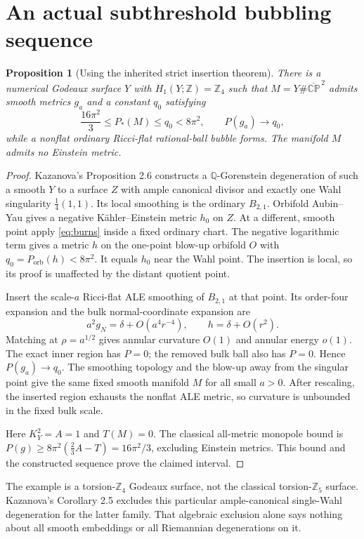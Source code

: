 \documentclass[11pt]{article}
\newtheorem{proposition}[theorem]{Proposition}
\newcommand{\CP}{\mathbb{CP}}
\newcommand{\orb}{\mathrm{orb}}
\begin{document}
\section{An actual subthreshold bubbling sequence}\label{sec:subthreshold}
\begin{proposition}[Using the inherited strict insertion theorem]
There is a numerical Godeaux surface $Y$ with $H_1(Y;\mathbb Z)=\mathbb Z_4$
such that $M=Y\#\overline{\CP}^{\,2}$ admits smooth metrics $g_a$ and a
constant $q_0$ satisfying
\[
 \frac{16\pi^2}{3}\le P_*(M)\le q_0<8\pi^2,
 \qquad P(g_a)\longrightarrow q_0,
\]
while a nonflat ordinary Ricci-flat rational-ball bubble forms.
The manifold $M$ admits no Einstein metric.
\end{proposition}
\begin{proof}
Kazanova's Proposition 2.6 constructs a $\mathbb Q$-Gorenstein degeneration
of such a smooth $Y$ to a surface $Z$ with ample canonical divisor and
exactly one Wahl singularity $\frac14(1,1)$. Its local smoothing is the
ordinary $B_{2,1}$. Orbifold Aubin--Yau gives a negative K\"ahler--Einstein
metric $h_0$ on $Z$. At a different, smooth point apply \eqref{eq:burns}
inside a fixed ordinary chart. The negative logarithmic term gives a
metric $h$ on the one-point blow-up orbifold $O$ with
$q_0=P_{\orb}(h)<8\pi^2$. It equals $h_0$ near the Wahl point.
The insertion is local, so its proof is unaffected by the distant quotient
point.

Insert the scale-$a$ Ricci-flat ALE smoothing of $B_{2,1}$ at that point.
Its order-four expansion and the bulk normal-coordinate expansion are
\[
 a^2g_N=\delta+O(a^4r^{-4}),\qquad h=\delta+O(r^2).
\]
Matching at $\rho=a^{1/2}$ gives annular curvature $O(1)$ and annular
energy $o(1)$. The exact inner region has $P=0$; the removed bulk ball
also has $P=0$. Hence $P(g_a)\to q_0$. The smoothing topology and the
blow-up away from the singular point give the same fixed smooth manifold
$M$ for all small $a>0$. After rescaling, the inserted region exhausts
the nonflat ALE metric, so curvature is unbounded in the fixed bulk scale.

Here $K_Y^2=A=1$ and $T(M)=0$. The classical all-metric monopole bound
is $P(g)\ge8\pi^2(\frac23A-T)=16\pi^2/3$, excluding Einstein metrics.
This bound and the constructed sequence prove the claimed interval.
\end{proof}

The example is a torsion-$\mathbb Z_4$ Godeaux surface, not the classical
torsion-$\mathbb Z_5$ surface. Kazanova's Corollary 2.5 excludes this
particular ample-canonical single-Wahl degeneration for the latter family.
That algebraic exclusion alone says nothing about all smooth embeddings
or all Riemannian degenerations on it.
\end{document}
